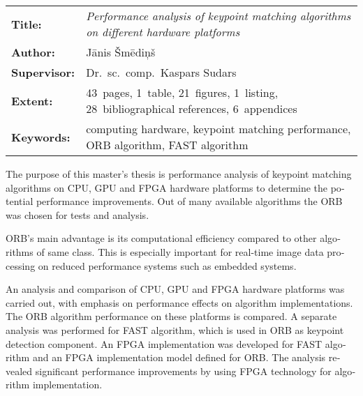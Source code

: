 \clearpage
\begin{english} %
	\abstitlestyle{\abstractname} %
	\noindent%
	\begin{tabularx}{\textwidth}{lX}
		\textbf{Title:} & 
			\textit{Performance analysis of keypoint matching algorithms on
			        different hardware platforms}\\[1ex]
		\textbf{Author:} & Jānis Šmēdiņš\\[1ex]
		\textbf{Supervisor:} & Dr.~sc.~comp.~Kaspars Sudars\\[1ex]
		\textbf{Extent:} & 43~pages, 1~table, 21~figures, 1~listing,
	                       28~bibliographical references, 6~appendices\\[1ex]
		\textbf{Keywords:} &
			computing hardware,
			keypoint matching performance,
			ORB algorithm,
			FAST algorithm
	\end{tabularx}
	
	\vspace{1em}
	
	The purpose of this master's thesis is performance analysis of
	keypoint matching algorithms on CPU, GPU and FPGA
	hardware platforms to determine
	the potential performance improvements. Out of many available algorithms
	the ORB was chosen for tests and analysis.
	
	ORB's main advantage is its computational efficiency compared to other
	algorithms of same class. This is especially important for 
	real-time image data processing on reduced
	performance systems such as embedded systems.
	
	An analysis and comparison of CPU, GPU and FPGA hardware platforms was
	carried out, with emphasis on performance effects on algorithm
	implementations. The ORB algorithm performance on these
	platforms is compared. A separate analysis was performed for FAST algorithm,
	which is used in ORB as keypoint detection component.
	An FPGA implementation was developed for FAST algorithm and
	an FPGA implementation
	model defined for ORB. The analysis revealed significant performance
	improvements by using FPGA technology for algorithm implementation.
\end{english}

